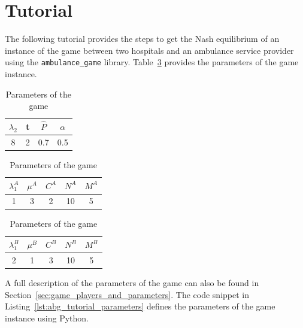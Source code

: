 \section{Tutorial}\label{sec:ambulance_game_tutorial}

The following tutorial provides the steps to get the Nash
equilibrium of an instance of the game between two hospitals and an ambulance
service provider using the \texttt{ambulance\_game} library.
Table~\ref{tab:ambulance_game_example} provides the parameters of the game
instance.

\begin{table}[H]
    \begin{center}
        \begin{tabular}{||c|c|c|c||}
            \hline
            \(\lambda_2\) & t & \footnotesize{\(\hat{P}\)} & \(\alpha\) \\
            \hline\hline
            8 & 2 & 0.7 & 0.5 \\
            \hline
        \end{tabular}

        \vspace{0.3cm}

        \begin{tabular}{||c|c|c|c|c||}
            \hline
            \(\lambda_1^A\) & \(\mu^A\) & \(C^A\) & \(N^A\) & \(M^A\) \\
            \hline\hline
            1 & 3 & 2 & 10 & 5 \\
            \hline
        \end{tabular}

        \vspace{0.3cm}
        
        \begin{tabular}{||c|c|c|c|c||}
            \hline
            \(\lambda_1^B\) & \(\mu^B\) & \(C^B\) & \(N^B\) & \(M^B\) \\
            \hline\hline
            2 & 1 & 3 & 10 & 5 \\
            \hline
        \end{tabular}
    \end{center}
    \caption{Parameters of the game}
    \label{tab:ambulance_game_example}
\end{table}

A full description of the parameters of the game can also be found in
Section~\ref{sec:game_players_and_parameters}.
The code snippet in Listing~\ref{lst:abg_tutorial_parameters} defines the
parameters of the game instance using Python.

